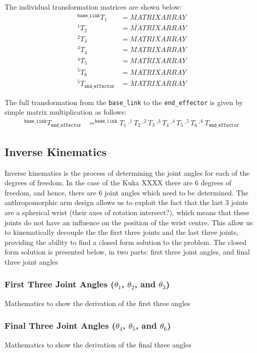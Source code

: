 \documentclass[a4paper]{article}
\begin{document}
The individual transformation matrices are shown below:
\begin{align*}
	^\texttt{base\_link} T_1 &= MATRIX ARRAY\\
	^1 T_2 &= MATRIX ARRAY\\
	^2 T_3 &= MATRIX ARRAY\\
	^3 T_4 &= MATRIX ARRAY\\
	^4 T_5 &= MATRIX ARRAY\\
	^5 T_6 &= MATRIX ARRAY\\
	^5 T_\texttt{end\_effector} &= MATRIX ARRAY
\end{align*}

The full transformation from the \verb|base_link| to the \verb|end_effector| is given by simple matrix multiplication as follows:
\begin{align*}
	^{\texttt{base\_link}} T_{\texttt{end\_effector}} &= ^{\texttt{base\_link}} T_{1} \cdot ^{1} T_{2} \cdot ^{2} T_{3} \cdot ^{3} T_{4} \cdot ^{4} T_{5} \cdot ^{5} T_{6} \cdot ^{6} T_{\texttt{end\_effector}}
\end{align*}

\subsection{Inverse Kinematics}
Inverse kinematics is the process of determining the joint angles for each of the degrees of freedom. In the case of the Kuka XXXX there are 6 degrees of freedom, and hence, there are 6 joint angles which need to be determined. The anthropomorphic arm design allows us to exploit the fact that the last 3 joints are a spherical wrist (their axes of rotation intersect?), which means that these joints do not have an influence on the position of the wrist centre. This allow us to kinematically decouple the the first three joints and the last three joints, providing the ability to find a closed form solution to the problem. The closed form solution is presented below, in two parts: first three joint angles, and final three joint angles

\subsubsection{First Three Joint Angles ($\theta_1$, $\theta_2$, and $\theta_3$)}
Mathematics to show the derivation of the first three angles

\subsubsection{Final Three Joint Angles ($\theta_4$, $\theta_5$, and $\theta_6$)}
Mathematics to show the derivation of the final three angles
\end{document}
